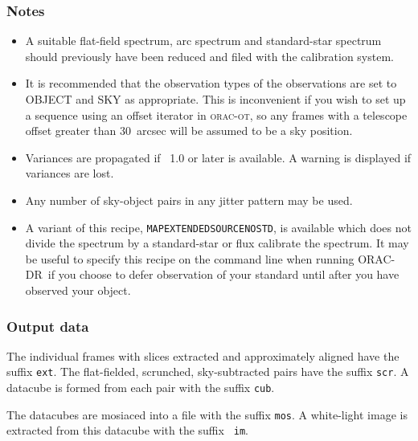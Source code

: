 \documentclass[twoside,11pt]{article}
\newcommand{\xref}[3]{#1}
\renewcommand{\_}{\texttt{\symbol{95}}}
\newcommand{\KAPPA}{\xref{{\sc{Kappa}}}{sun95}{}}
\newcommand{\ORACDR}{{\footnotesize ORAC-DR}}
\begin{document}
\subsubsection*{Notes}\begin{itemize}
\item

  A suitable flat-field spectrum, arc spectrum and standard-star
  spectrum should previously have been reduced and filed with the
  calibration system.

\item

It is recommended that the observation types of the observations are set
to OBJECT and SKY as appropriate. This is inconvenient if you wish to
set up a sequence using an offset iterator in \textsc{orac-ot}, so any frames
with a telescope offset greater than 30~arcsec will be assumed to be a
sky position.

\item

Variances are propagated if \KAPPA\ 1.0 or later is available. A warning
is displayed if variances are lost.

\item

Any number of sky-object pairs in any jitter pattern may be used.

\item
A variant of this recipe, {\tt MAP\_EXTENDED\_SOURCE\_NOSTD}, is
available which does not divide the spectrum by a standard-star or
flux calibrate the spectrum. It may be useful to specify this recipe
on the command line when running \ORACDR\ if you choose to defer
observation of your standard until after you have observed your
object.

\end{itemize}

\subsubsection*{Output data}

The individual frames with slices extracted and approximately aligned
have the suffix {\tt \_ext}. The flat-fielded, scrunched,
sky-subtracted pairs have the suffix {\tt \_scr}. A datacube is
formed from each pair with the suffix {\tt \_cub}.

The datacubes are mosiaced into a file with the suffix {\tt \_mos}. A
white-light image is extracted from this datacube with the suffix {\tt
  \_im}.
\end{document}
